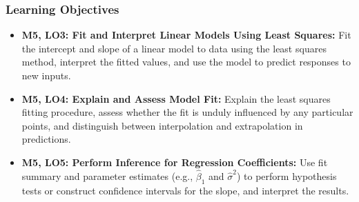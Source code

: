\begin{frame}
    \frametitle{Learning Objectives}
    \begin{itemize}
        \item \textbf{M5, LO3: Fit and Interpret Linear Models Using Least Squares:} Fit the intercept and slope of a linear model to data using the least squares method, interpret the fitted values, and use the model to predict responses to new inputs.
        \item \textbf{M5, LO4: Explain and Assess Model Fit:} Explain the least squares fitting procedure, assess whether the fit is unduly influenced by any particular points, and distinguish between interpolation and extrapolation in predictions.
        \item \textbf{M5, LO5: Perform Inference for Regression Coefficients:} Use fit summary and parameter estimates (e.g., $\hat{\beta}_1$ and $\hat{\sigma}^2$) to perform hypothesis tests or construct confidence intervals for the slope, and interpret the results.
    \end{itemize}
\end{frame}
    
